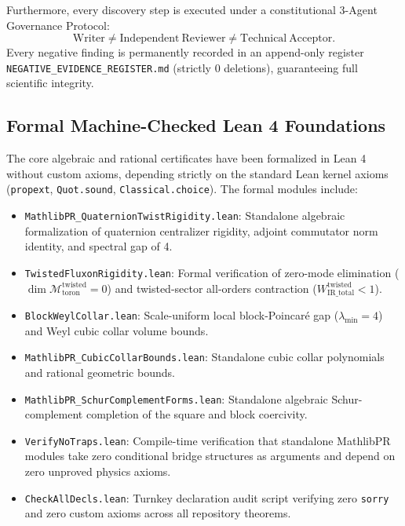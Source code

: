 \documentclass[11pt,a4paper]{article}
\theoremstyle{definition}
\theoremstyle{remark}
\begin{document}
Furthermore, every discovery step is executed under a constitutional 3-Agent Governance Protocol:
\begin{equation}
\mathrm{Writer} \ne \mathrm{Independent\ Reviewer} \ne \mathrm{Technical\ Acceptor}.
\end{equation}
Every negative finding is permanently recorded in an append-only register \texttt{NEGATIVE\_\allowbreak EVIDENCE\_\allowbreak REGISTER.md} (strictly 0 deletions), guaranteeing full scientific integrity.

\subsection{Formal Machine-Checked Lean 4 Foundations}
The core algebraic and rational certificates have been formalized in Lean 4 without custom axioms, depending strictly on the standard Lean kernel axioms (\texttt{propext}, \texttt{Quot.sound}, \texttt{Classical.choice}). The formal modules include:
\begin{itemize}[leftmargin=*]
    \item \texttt{MathlibPR\_\allowbreak QuaternionTwistRigidity.lean}: Standalone algebraic formalization of quaternion centralizer rigidity, adjoint commutator norm identity, and spectral gap of 4.
    \item \texttt{TwistedFluxonRigidity.lean}: Formal verification of zero-mode elimination ($\dim \mathcal{M}_{\mathrm{toron}}^{\mathrm{twisted}} = 0$) and twisted-sector all-orders contraction ($W_{\mathrm{IR\_total}}^{\mathrm{twisted}} < 1$).
    \item \texttt{BlockWeylCollar.lean}: Scale-uniform local block-Poincar\'e gap ($\lambda_{\min} = 4$) and Weyl cubic collar volume bounds.
    \item \texttt{MathlibPR\_\allowbreak CubicCollarBounds.lean}: Standalone cubic collar polynomials and rational geometric bounds.
    \item \texttt{MathlibPR\_\allowbreak SchurComplementForms.lean}: Standalone algebraic Schur-complement completion of the square and block coercivity.
    \item \texttt{VerifyNoTraps.lean}: Compile-time verification that standalone MathlibPR modules take zero conditional bridge structures as arguments and depend on zero unproved physics axioms.
    \item \texttt{CheckAllDecls.lean}: Turnkey declaration audit script verifying zero \texttt{sorry} and zero custom axioms across all repository theorems.
\end{itemize}
\end{document}
